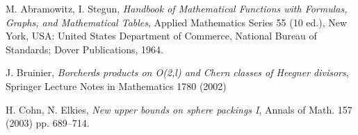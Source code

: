 \begin{thebibliography}{20}
 {\sc M. Abramowitz, I. Stegun}, \emph{ Handbook of Mathematical Functions with Formulas, Graphs, and Mathematical Tables}, Applied Mathematics Series 55 (10 ed.), New York, USA: United States Department of Commerce, National Bureau of Standards; Dover Publications, 1964.


 {\sc J. Bruinier}, \emph{Borcherds products on O(2,l) and Chern classes of Heegner divisors}, Springer Lecture Notes in Mathematics 1780 (2002)

  {\sc H. Cohn, N. Elkies}, \emph{New upper bounds on sphere packings I}, Annals of Math. 157 (2003) pp. 689--714.












\end{thebibliography}
